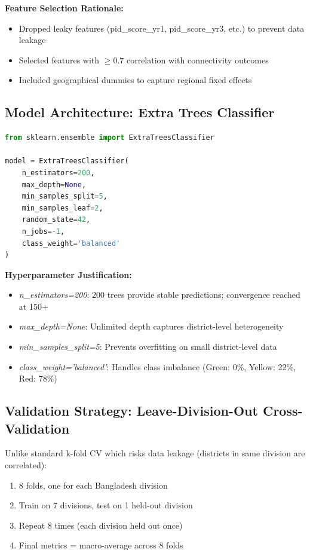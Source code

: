 \documentclass[11pt,a4paper]{article}
\begin{document}
\textbf{Feature Selection Rationale:}
\begin{itemize}
  \item Dropped leaky features (pid\_score\_yr1, pid\_score\_yr3, etc.) to prevent data leakage
  \item Selected features with $\geq 0.7$ correlation with connectivity outcomes
  \item Included geographical dummies to capture regional fixed effects
\end{itemize}

\subsection{Model Architecture: Extra Trees Classifier}

\begin{lstlisting}[language=Python]
from sklearn.ensemble import ExtraTreesClassifier

model = ExtraTreesClassifier(
    n_estimators=200,
    max_depth=None,
    min_samples_split=5,
    min_samples_leaf=2,
    random_state=42,
    n_jobs=-1,
    class_weight='balanced'
)
\end{lstlisting}

\textbf{Hyperparameter Justification:}
\begin{itemize}
  \item \textit{n\_estimators=200}: 200 trees provide stable predictions; convergence reached at 150+
  \item \textit{max\_depth=None}: Unlimited depth captures district-level heterogeneity
  \item \textit{min\_samples\_split=5}: Prevents overfitting on small district-level data
  \item \textit{class\_weight='balanced'}: Handles class imbalance (Green: 0\%, Yellow: 22\%, Red: 78\%)
\end{itemize}

\subsection{Validation Strategy: Leave-Division-Out Cross-Validation}

Unlike standard k-fold CV which risks data leakage (districts in same division are correlated):

\begin{enumerate}
  \item 8 folds, one for each Bangladesh division
  \item Train on 7 divisions, test on 1 held-out division
  \item Repeat 8 times (each division held out once)
  \item Final metrics = macro-average across 8 folds
\end{enumerate}
\end{document}
